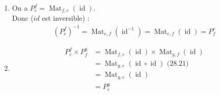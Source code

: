 \documentclass[../main.tex]{subfiles}
\begin{document}
\begin{enumerate}
    \item On a $P_e^f = \operatorname{Mat}_{f,e}(\operatorname{id})$. \\
    Donc ($id$ est inversible) : 
    \begin{align*}
        (P_e^f)^{-1} = \operatorname{Mat}_{e,f}(\operatorname{id}^{-1}) = \operatorname{Mat}_{e,f}(\operatorname{id}) = P_f^e
    \end{align*}

    \item \begin{align*}
        P_e^f\times P_f^g &= \operatorname{Mat}_{f,e}(\operatorname{id})\times \operatorname{Mat}_{g,f}(\operatorname{id}) \\
        &= \operatorname{Mat}_{g,e}(\operatorname{id}\circ \operatorname{id}) \text{ (28.21)} \\
        &= \operatorname{Mat}_{g,e}(\operatorname{id}) \\
        &= P_e^g
    \end{align*}
\end{enumerate}
\end{document}
